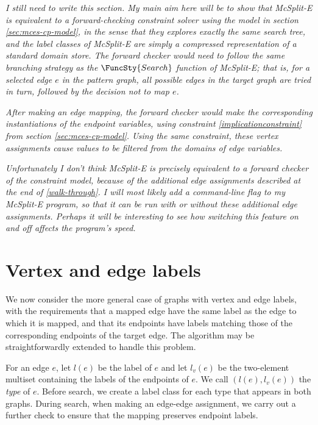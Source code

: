 \emph{
  I still need to write this section.  My main aim here will be to show that McSplit-E
  is equivalent to a forward-checking constraint solver using the model in section
  \ref{sec:mces-cp-model}, in the sense that they explores exactly the same search
  tree, and the label classes of McSplit-E are simply a compressed representation
  of a standard domain store.  The forward checker would need to follow the same branching
  strategy as the $\FuncSty{Search}$ function of McSplit-E; that is, for a selected
  edge $e$ in the pattern graph, all possible edges in the target graph are tried in turn,
  followed by the decision not to map $e$.
}

\emph{
  After making an edge mapping, the forward checker would make the corresponding instantiations
  of the endpoint variables, using constraint \ref{implicationconstraint} from section
  \ref{sec:mces-cp-model}.  Using the same constraint, these vertex assignments cause
  values to be filtered from the domains of edge variables.
}

\emph{
  Unfortunately I don't think McSplit-E is precisely equivalent to a forward checker of
  the constraint model, because of the additional edge assignments described at the
  end of \ref{walk-through}.  I will most likely add a command-line flag to my McSplit-E
  program, so that it can be run with or without these additional edge assignments.
  Perhaps it will be interesting to see how switching this feature on and off
  affects the program's speed.
}

\section{Vertex and edge labels}\label{sec:labels}

We now consider the more general case of graphs with vertex and edge labels,
with the requirements that a mapped edge have the same label as the edge to which it is mapped, and
that its endpoints have labels matching those of the corresponding endpoints of the target edge.
The algorithm may be straightforwardly extended to handle this problem.

For an edge $e$, let $l(e)$ be the label of $e$ and let $l_v(e)$ be the two-element multiset
containing the labels of the endpoints of $e$.  We call $(l(e), l_v(e))$ the \emph{type} of $e$.  Before
search, we create a label class for each type that appears in both graphs.  During search,
when making an edge-edge assignment, we carry out a further check to ensure that the mapping
preserves endpoint labels.

